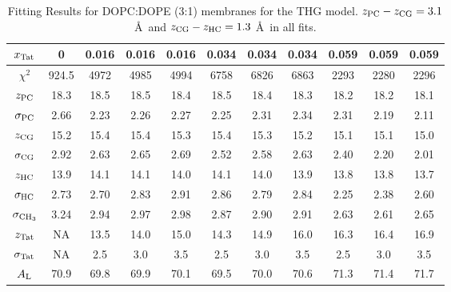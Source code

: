 \begin{table}[htbp]
  \centering
  \begin{tabular}{ccccccccccc}
    \hline
    $x_\textrm{Tat}$ & 0 & 0.016 & 0.016 & 0.016 & 0.034 & 0.034 & 0.034 & 0.059 & 0.059 & 0.059 \\
    \hline
    $\chi^2$ & 924.5 & 4972 & 4985 & 4994 & 6758 & 6826 & 6863 & 2293 & 2280 & 2296 \\ 
    $z_\textrm{PC}$ & 18.3 & 18.5 & 18.5 & 18.4 & 18.5 & 18.4 & 18.3 & 18.2 & 18.2 & 18.1 \\
    $\sigma_\textrm{PC}$ & 2.66 & 2.23 & 2.26 & 2.27 & 2.25 & 2.31 & 2.34 & 2.31 & 2.19 & 2.11 \\
    $z_\textrm{CG}$ & 15.2 & 15.4 & 15.4 & 15.3 & 15.4 & 15.3 & 15.2 & 15.1 & 15.1 & 15.0 \\
    $\sigma_\textrm{CG}$ & 2.92 & 2.63 & 2.65 & 2.69 & 2.52 & 2.58 & 2.63 & 2.40 & 2.20 & 2.01 \\
    $z_\textrm{HC}$ & 13.9 & 14.1 & 14.1 & 14.0 & 14.1 & 14.0 & 13.9 & 13.8 & 13.8 & 13.7 \\
    $\sigma_\textrm{HC}$ & 2.73 & 2.70 & 2.83 & 2.91 & 2.86 & 2.79 & 2.84 & 2.25 & 2.38 & 2.60 \\
    $\sigma_{\textrm{CH}_3}$ & 3.24 & 2.94 & 2.97 & 2.98 & 2.87 & 2.90 & 2.91 & 2.63 & 2.61 & 2.65 \\
    $z_\textrm{Tat}$ & NA & 13.5 & 14.0 & 15.0 & 14.3 & 14.9 & 16.0 & 16.3 & 16.4 & 16.9 \\
    $\sigma_\textrm{Tat}$ & NA & 2.5 & 3.0 & 3.5 & 2.5 & 3.0 & 3.5 & 2.5 & 3.0 & 3.5 \\ 
    $A_\textrm{L}$ & 70.9 & 69.8 & 69.9 & 70.1 & 69.5 & 70.0 & 70.6 & 71.3 & 71.4 & 71.7 \\
    \hline
  \end{tabular}
  \caption{Fitting Results for DOPC:DOPE (3:1) membranes for the THG model. $z_\textrm{PC}-z_\textrm{CG} = 3.1$ \AA\
  and $z_\textrm{CG}-z_\textrm{HC} = 1.3$ \AA\ in all fits.}
  \label{tb:DOPCDOPE3to1_fit_results}
\end{table}

